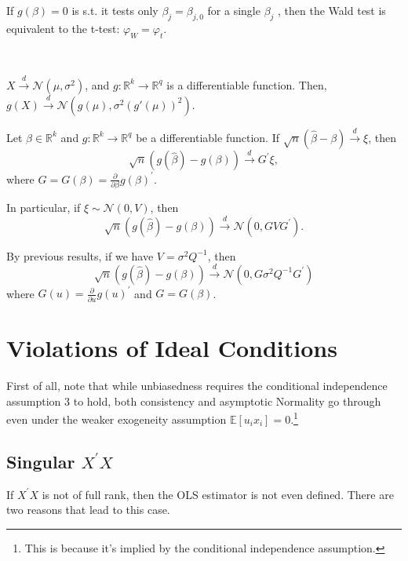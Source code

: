 If $g(\beta)=0$ is s.t. it tests only $\beta_{j}=\beta_{j, 0}$ for a single $\beta_{j}$ , then the Wald test is equivalent to the t-test:  $\varphi_{W}=\varphi_{t}$.

\begin{theorem}
  \

  $X \overset{d}{\rightarrow}\mathcal{N} (\mu, \sigma^2)$, and $g: \mathbb{R}^k \rightarrow \mathbb{R}^q$ is a differentiable function. 
  Then, $g(X) \overset{d}{\rightarrow} \mathcal{N} (g(\mu), \sigma^2(g'(\mu))^2)$.

  Let $\beta \in \mathbb{R}^k$ and $g: \mathbb{R}^k \rightarrow \mathbb{R}^q$ be a differentiable function.
  If $\sqrt{n}(\hat{\beta} - \beta) \overset{d}{\rightarrow} \xi$, then
  \[ 
  \sqrt{n}(g(\hat{\beta}) - g(\beta)) \overset{d}{\rightarrow} G^{\prime} \xi,
  \]
  where $G = G(\beta) = \frac{\partial}{\partial \beta}g(\beta)^{\prime}.$

  In particular, if $\xi \sim \mathcal{N}(0, V)$, then
  \[\sqrt{n}(g(\hat{\beta}) - g(\beta)) \overset{d}{\rightarrow} \mathcal{N}(0, G V G^{\prime}).\]

  By previous results, if we have $V = \sigma^2 Q^{-1}$, then
  \[ 
    \sqrt{n}(g(\hat{\beta}) - g(\beta)) \overset{d}{\rightarrow} \mathcal{N} (0, G \sigma^2 Q^{-1} G^{\prime})
  \]
  where $G(u) = \frac{\partial}{\partial u}g(u)^{\prime} $ and $G = G(\beta )$.
\end{theorem}

\section{Violations of Ideal Conditions}

First of all, note that while unbiasedness requires the conditional independence assumption
3 to hold, both consistency and asymptotic Normality go through even under the weaker
exogeneity assumption $\mathbb{E}[u_i x_i] = 0.$\footnote{This is because it's implied by the conditional independence assumption.}

\subsection{Singular $X^{\prime} X$}
If $X^{\prime} X$ is not of full rank, then the OLS estimator is not even defined. There are two reasons
that lead to this case.

